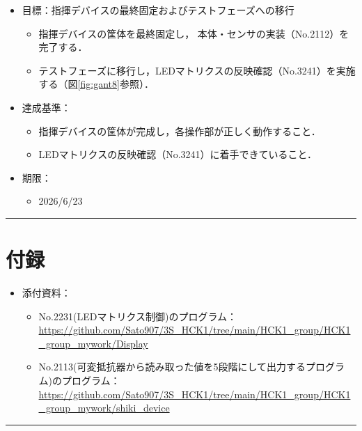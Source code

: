 \documentclass[uplatex,dvipdfmx,a4paper,11pt]{jsarticle}
\newcommand{\sectionrule}{\par\medskip\noindent\rule{\linewidth}{0.6pt}\par\medskip}
\begin{document}
\begin{itemize}

  \item 目標：指揮デバイスの最終固定およびテストフェーズへの移行
    \begin{itemize}
      \item 指揮デバイスの筐体を最終固定し，
      本体・センサの実装（No.2112）を完了する．

      \item テストフェーズに移行し，LEDマトリクスの反映確認（No.3241）を実施する（図\ref{fig:gant8}参照）．
    \end{itemize}

  \item 達成基準：
    \begin{itemize}
      \item 指揮デバイスの筐体が完成し，各操作部が正しく動作すること．

      \item LEDマトリクスの反映確認（No.3241）に着手できていること．
    \end{itemize}

  \item 期限：
    \begin{itemize}
      \item 2026/6/23
    \end{itemize}

\end{itemize}


\sectionrule


\section{付録}

\begin{itemize}
  \item 添付資料：
    \begin{itemize}
      \item No.2231(LEDマトリクス制御)のプログラム：\url{https://github.com/Sato907/3S_HCK1/tree/main/HCK1_group/HCK1_group_mywork/Display}
      \item No.2113(可変抵抗器から読み取った値を5段階にして出力するプログラム)のプログラム：\url{https://github.com/Sato907/3S_HCK1/tree/main/HCK1_group/HCK1_group_mywork/shiki_device}

    \end{itemize}

\end{itemize}

\sectionrule
\end{document}
